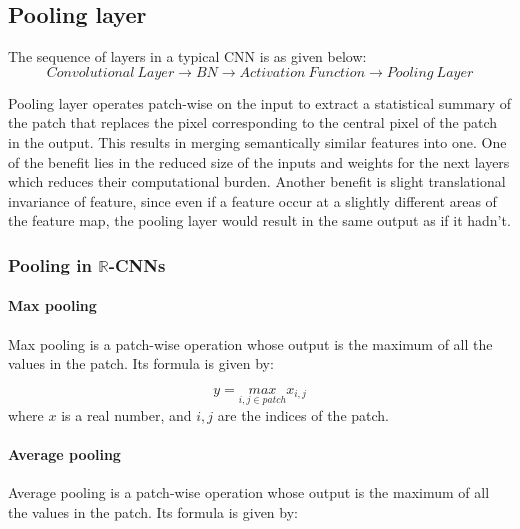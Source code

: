 
 
 \subsection{Pooling layer}
 The sequence of layers in a typical CNN is as given below: 
 \begin{equation}
 Convolutional \ Layer\longrightarrow BN \longrightarrow Activation \ Function \longrightarrow  Pooling \ Layer
 \end{equation}
 
 Pooling layer operates patch-wise on the input to extract a statistical summary of the patch that replaces the pixel corresponding to the central pixel of the patch in the output. This results in merging semantically similar features into one. One of the benefit lies in the reduced size of the inputs and weights for the next layers which reduces their computational burden. Another benefit is slight translational invariance of feature, since even if a feature occur at a slightly different areas of the feature map, the pooling layer would result in the same output as if it hadn't. 

 \subsubsection{Pooling in $\mathbb{R}$-CNNs}
 \paragraph{Max pooling}
 Max pooling is a patch-wise operation whose output is the maximum of all the values in the patch. Its formula is given by:
 
 \begin{equation}
 y = \underset{i,j \in patch}{max} x_{i,j}
 \end{equation}
 where $x$ is a real number, and $i,j$ are the indices of the patch.
 
 \paragraph{Average pooling}
 Average pooling is a patch-wise operation whose output is the maximum of all the values in the patch. Its formula is given by:

